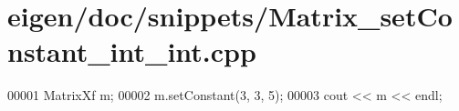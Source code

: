 \hypertarget{eigen_2doc_2snippets_2_matrix__set_constant__int__int_8cpp_source}{}\section{eigen/doc/snippets/\+Matrix\+\_\+set\+Constant\+\_\+int\+\_\+int.cpp}
\label{eigen_2doc_2snippets_2_matrix__set_constant__int__int_8cpp_source}

\begin{DoxyCode}
00001 MatrixXf m;
00002 m.setConstant(3, 3, 5);
00003 cout << m << endl;
\end{DoxyCode}
